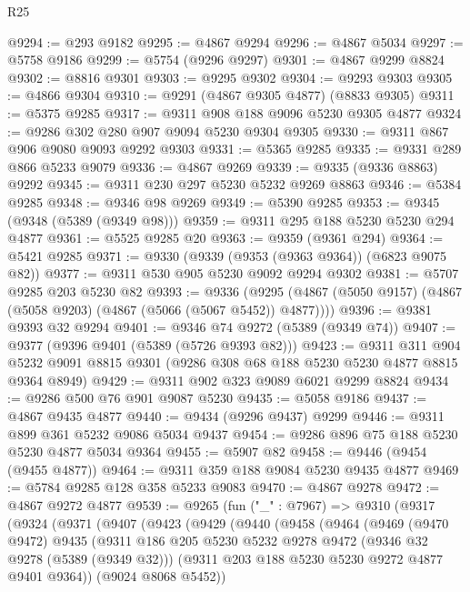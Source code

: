 \begin{lexlean}{R25}
\begin{coremodule}
@9294 := @293 @9182
@9295 := @4867 @9294
@9296 := @4867 @5034
@9297 := @5758 @9186
@9299 := @5754 (@9296 @9297)
@9301 := @4867 @9299 @8824
@9302 := @8816 @9301
@9303 := @9295 @9302
@9304 := @9293 @9303
@9305 := @4866 @9304
@9310 := @9291 (@4867 @9305 @4877) (@8833 @9305)
@9311 := @5375 @9285
@9317 := @9311 @908 @188 @9096 @5230 @9305 @4877
@9324 := @9286 @302 @280 @907 @9094 @5230 @9304 @9305
@9330 := @9311 @867 @906 @9080 @9093 @9292 @9303
@9331 := @5365 @9285
@9335 := @9331 @289 @866 @5233 @9079
@9336 := @4867 @9269
@9339 := @9335 (@9336 @8863) @9292
@9345 := @9311 @230 @297 @5230 @5232 @9269 @8863
@9346 := @5384 @9285
@9348 := @9346 @98 @9269
@9349 := @5390 @9285
@9353 := @9345 (@9348 (@5389 (@9349 @98)))
@9359 := @9311 @295 @188 @5230 @5230 @294 @4877
@9361 := @5525 @9285 @20
@9363 := @9359 (@9361 @294)
@9364 := @5421 @9285
@9371 := @9330 (@9339 (@9353 (@9363 @9364)) (@6823 @9075 @82))
@9377 := @9311 @530 @905 @5230 @9092 @9294 @9302
@9381 := @5707 @9285 @203 @5230 @82
@9393 := @9336
    (@9295 (@4867 (@5050 @9157) (@4867 (@5058 @9203) (@4867 (@5066 (@5067 @5452)) @4877))))
@9396 := @9381 @9393 @32 @9294
@9401 := @9346 @74 @9272 (@5389 (@9349 @74))
@9407 := @9377 (@9396 @9401 (@5389 (@5726 @9393 @82)))
@9423 := @9311
    @311
    @904
    @5232
    @9091
    @8815
    @9301
    (@9286 @308 @68 @188 @5230 @5230 @4877 @8815 @9364 @8949)
@9429 := @9311 @902 @323 @9089 @6021 @9299 @8824
@9434 := @9286 @500 @76 @901 @9087 @5230
@9435 := @5058 @9186
@9437 := @4867 @9435 @4877
@9440 := @9434 (@9296 @9437) @9299
@9446 := @9311 @899 @361 @5232 @9086 @5034 @9437
@9454 := @9286 @896 @75 @188 @5230 @5230 @4877 @5034 @9364
@9455 := @5907 @82
@9458 := @9446 (@9454 (@9455 @4877))
@9464 := @9311 @359 @188 @9084 @5230 @9435 @4877
@9469 := @5784 @9285 @128 @358 @5233 @9083
@9470 := @4867 @9278
@9472 := @4867 @9272 @4877
@9539 := @9265
    (fun ("_" : @7967) =>
    @9310
      (@9317
        (@9324
          (@9371
            (@9407
              (@9423
                (@9429
                  (@9440
                    (@9458
                      (@9464
                        (@9469
                          (@9470 @9472)
                          @9435
                          (@9311
                            @186
                            @205
                            @5230
                            @5232
                            @9278
                            @9472
                            (@9346 @32 @9278 (@5389 (@9349 @32)))
                            (@9311 @203 @188 @5230 @5230 @9272 @4877 @9401 @9364))
                          (@9024 @8068 @5452))

\end{coremodule}
\end{lexlean}
